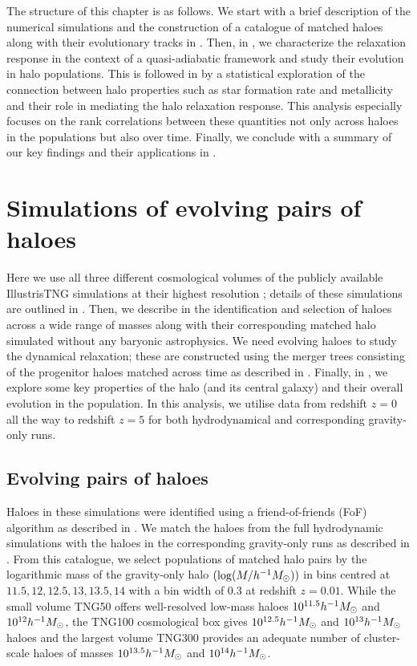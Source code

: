The structure of this chapter is as follows. We start with a brief description of the numerical simulations and the construction of a catalogue of matched haloes along with their evolutionary tracks in . Then, in , we characterize the relaxation response in the context of a quasi-adiabatic framework and study their evolution in halo populations. This is followed in  by a statistical exploration of the connection between halo properties such as star formation rate and metallicity and their role in mediating the halo relaxation response. This analysis especially focuses on the rank correlations between these quantities not only across haloes in the populations but also over time. Finally, we conclude with a summary of our key findings and their applications in .


\section{Simulations of evolving pairs of haloes}
\label{sec:simhals}
Here we use all three different cosmological volumes of the publicly available IllustrisTNG simulations at their highest resolution \citep{2019ComAC...6....2N}; details of these simulations are outlined in . Then, we describe in  the identification and selection of haloes across a wide range of masses along with their corresponding matched halo simulated without any baryonic astrophysics. We need evolving haloes to study the dynamical relaxation; these are constructed using the merger trees consisting of the progenitor haloes matched across time as described in . Finally, in , we explore some key properties of the halo (and its central galaxy) and their overall evolution in the population. In this analysis, we utilise data from redshift $z=0$ all the way to redshift $z=5$ for both hydrodynamical and corresponding gravity-only runs.

\subsection{Evolving pairs of haloes}
\label{sec:methods-halopairsel}
Haloes in these simulations were identified using a friend-of-friends (FoF) algorithm as described in . We match the haloes from the full hydrodynamic simulations with the haloes in the corresponding gravity-only runs as described in . From this catalogue, we select populations of matched halo pairs by the logarithmic mass of the gravity-only halo $(\log(M/h^{-1}M_{\odot}))$ in bins centred at $11.5, 12, 12.5, 13, 13.5, 14$ with a bin width of 0.3 at redshift $z=0.01$. While the small volume TNG50 offers well-resolved low-mass haloes $10^{11.5} h^{-1}M_{\odot}$ and $10^{12} h^{-1}M_{\odot}$, the TNG100 cosmological box gives $10^{12.5} h^{-1}M_{\odot}$ and $10^{13} h^{-1}M_{\odot}$ haloes and the largest volume TNG300 provides an adequate number of cluster-scale haloes of masses $10^{13.5} h^{-1}M_{\odot}$ and $10^{14} h^{-1}M_{\odot}$. 

